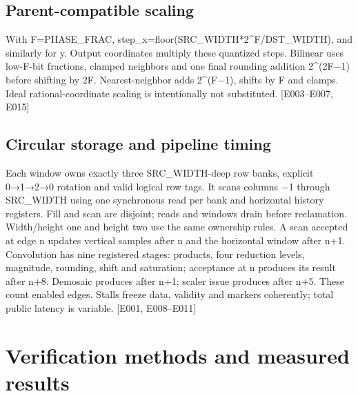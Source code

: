 \documentclass[11pt,a4paper]{article}
\begin{document}
\subsection{Parent-compatible scaling}

With F=\allowbreak{}PHASE\_\allowbreak{}FRAC,\allowbreak{} step\_\allowbreak{}x=\allowbreak{}floor(\allowbreak{}SRC\_\allowbreak{}WIDTH*\allowbreak{}2\textasciicircum{}F/\allowbreak{}DST\_\allowbreak{}WIDTH)\allowbreak{},\allowbreak{} and similarly for y. Output coordinates multiply these quantized steps. Bilinear uses low-F-bit fractions,\allowbreak{} clamped neighbors and one final rounding addition 2\textasciicircum{}(\allowbreak{}2F{\vulcanmathsymbols −}1)\allowbreak{} before shifting by 2F. Nearest-neighbor adds 2\textasciicircum{}(\allowbreak{}F{\vulcanmathsymbols −}1)\allowbreak{},\allowbreak{} shifts by F and clamps. Ideal rational-coordinate scaling is intentionally not substituted. [\allowbreak{}E003–E007,\allowbreak{} E015]\allowbreak{}

\subsection{Circular storage and pipeline timing}

Each window owns exactly three SRC\_\allowbreak{}WIDTH-deep row banks,\allowbreak{} explicit 0{\vulcanmathsymbols →}1{\vulcanmathsymbols →}2{\vulcanmathsymbols →}0 rotation and valid logical row tags. It scans columns {\vulcanmathsymbols −}1 through SRC\_\allowbreak{}WIDTH using one synchronous read per bank and horizontal history registers. Fill and scan are disjoint; reads and windows drain before reclamation. Width/\allowbreak{}height one and height two use the same ownership rules. A scan accepted at edge n updates vertical samples after n and the horizontal window after n+\allowbreak{}1. Convolution has nine registered stages: products,\allowbreak{} four reduction levels,\allowbreak{} magnitude,\allowbreak{} rounding,\allowbreak{} shift and saturation; acceptance at n produces its result after n+\allowbreak{}8. Demosaic produces after n+\allowbreak{}1; scaler issue produces after n+\allowbreak{}5. These count enabled edges. Stalls freeze data,\allowbreak{} validity and markers coherently; total public latency is variable. [\allowbreak{}E001,\allowbreak{} E008–E011]\allowbreak{}

\section{Verification methods and measured results}
\end{document}
